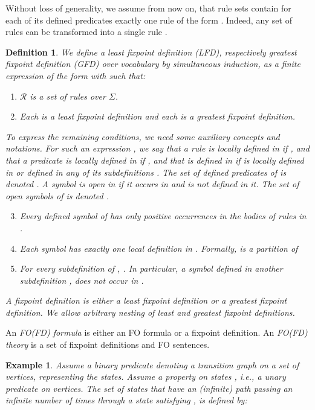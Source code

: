 \documentclass{tlp}
\newcommand{\Voc}{\ensuremath{\Sigma}\xspace}
\newcommand{\Rules}{\ensuremath{\mathcal{R}}\xspace}
\newtheorem{example}[lemma]{Example}
\newtheorem{definition}[lemma]{Definition}
\begin{document}
Without loss of generality, we assume from now on, that rule sets contain for each of its defined predicates exactly one rule of the form . Indeed, any set of rules  can be transformed into a single rule .

\begin{definition} \label{def:fixpointdefinition}
We define a {\em least fixpoint definition} (LFD), respectively {\em greatest fixpoint definition} (GFD) over vocabulary  by simultaneous induction, as a finite expression  of the form  with  such that:
\begin{enumerate}
\item \Rules is a set of rules over \Voc.
\item Each  is a least fixpoint definition and each  is a greatest fixpoint definition.
\end{enumerate}
To express the remaining conditions, we need some auxiliary concepts and notations. For such an expression , we say that a rule  is {\em locally defined} in  if , and that a predicate  is {\em locally defined} in  if , and that  is {\em defined} in  if  is locally defined in  or defined in any of its subdefinitions . The set of defined predicates of  is denoted . A symbol is {\em open} in  if it occurs in  and is not defined in it. The set of open symbols of  is denoted .
\begin{enumerate}
\setcounter{enumi}{2}
\item Every defined symbol of  has only positive occurrences in the bodies of rules in .
\item Each symbol  has exactly one local definition in . Formally,  is a partition of 
\item For every subdefinition  of , . In  particular, a symbol defined in another subdefinition , does not occur in .
\end{enumerate}
A {\em fixpoint definition} is either a least fixpoint definition or a greatest fixpoint definition. We allow arbitrary nesting of least and greatest fixpoint definitions.
\end{definition}

An {\em FO(FD) formula} is either an FO formula or a fixpoint definition. An {\em FO(FD) theory} is a set of fixpoint definitions and FO sentences.

\begin{example}\label{ex:infinitetr}
Assume a binary predicate  denoting a transition graph on a set of vertices, representing the states. Assume a property on states , i.e., a unary predicate on vertices. The set of states  that have an (infinite) path passing an infinite number of times through a state satisfying , is defined by:

\end{example}
\end{document}
